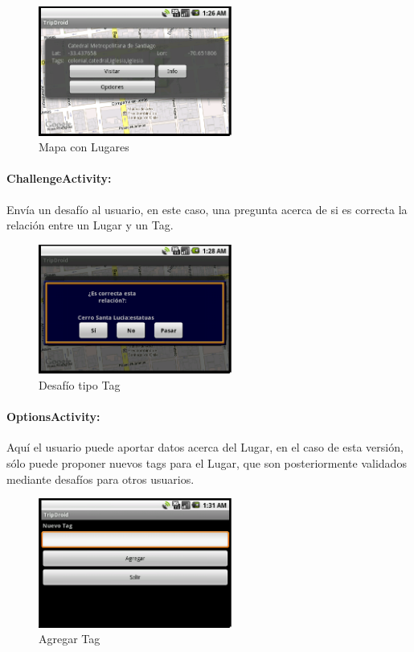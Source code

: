 \documentclass[10pt,letterpaper]{article}
\begin{document}
\begin{figure}[h]
\begin{center}
\includegraphics[width=180pt]{./imgs/TripdroidMapaMenu.png}
\caption{Mapa con Lugares}
\end{center}
\end{figure}

\newpage
\paragraph{ChallengeActivity:} Envía un desafío al usuario, en este caso, una pregunta acerca de si es correcta la relación entre un Lugar y un Tag.

\begin{figure}[h]
\begin{center}
\includegraphics[width=180pt]{./imgs/TripdroidDesafio.png}
\caption{Desafío tipo Tag}
\end{center}
\end{figure}

\paragraph{OptionsActivity:} Aquí el usuario puede aportar datos acerca del Lugar, en el caso de esta versión, sólo puede proponer nuevos tags para el Lugar, que son posteriormente validados mediante desafíos para otros usuarios.

\begin{figure}[h]
\begin{center}
\includegraphics[width=180pt]{./imgs/TripdroidOpciones.png}
\caption{Agregar Tag}
\end{center}
\end{figure}
\end{document}
